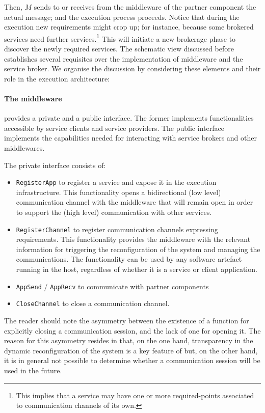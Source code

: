 %
Then, $M$ sends to or receives from the middleware of the
partner component the actual message; and the execution process
proceeds.
%
Notice that during the execution new requirements might crop up; for
instance, because some brokered services need further
services.\footnote{%
  This implies that a service may have one or more required-points
  associated to communication channels of its own.
}
% 
This will initiate a new brokerage phase to discover the newly
required services.
%
The schematic view discussed before establishes several requisites over
the implementation of middleware and the service broker.
%
We organise the discussion by considering these elements and their
role in the execution architecture:

\paragraph{{\bf The middleware}} provides a private and a public
interface.
%
The former implements functionalities accessible by service clients
and service providers.
%
The public interface implements the capabilities needed for
interacting with service brokers and other middlewares.

The private interface consists of:
\begin{itemize}
\item \texttt{RegisterApp} to register a service and expose it in the
  execution infrastructure. This functionality opens a bidirectional
  (low level) communication channel with the middleware that
  will remain open in order to support the (high level) communication
  with other services.
\item \texttt{RegisterChannel} to register communication channels expressing requirements.
  This functionality  provides the middleware with the relevant information for triggering
  the reconfiguration of the system and managing the communications.
  The functionality can be used by any software artefact running in
  the host, regardless of whether it is a service or client application.
\item \texttt{AppSend} / \texttt{AppRecv} to communicate with partner
  components
\item \texttt{CloseChannel} to close a communication channel.
\end{itemize}
The reader should note the asymmetry between the existence of a
function for explicitly closing a communication session, and the lack
of one for opening it.
%
The reason for this asymmetry resides in that, on the one hand,
transparency in the dynamic reconfiguration of the system is a key
feature of \SEArch but, on the other hand, it is in general not
possible to determine whether a communication session will be used in
the future.

